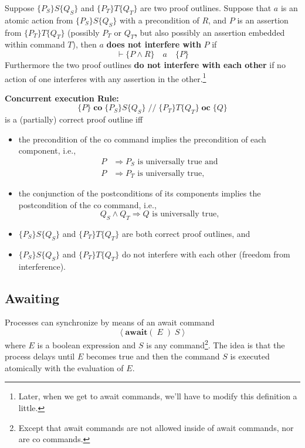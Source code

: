 \documentclass[muchmore,11pt]{article}%
\begin{document}
Suppose $\{P_{S}\}S\{Q_{S}\}$ and $\{P_{T}\}T\{Q_{T}\}$ are two proof
outlines. Suppose that $a$ is an atomic action from $\{P_{S}\}S\{Q_{S}\}$ with
a precondition of $R$, and $P$ is an assertion from $\{P_{T}\}T\{Q_{T}\}$
(possibly $P_{T}$ or $Q_{T}$\textbf{,} but also possibly an assertion embedded
within command $T$), then $a$ \textbf{does not interfere with} $P$ if%
\[
\vdash\{P\wedge R\}\quad a\quad\{P\}
\]
Furthermore the two proof outlines \textbf{do not interfere with each other}
if no action of one interferes with any assertion in the
other.\footnote{Later, when we get to await commands, we'll have to modify
this definition a little.}

\textbf{Concurrent execution Rule:}
\[
\{P\}\;\mathbf{co}\;\{P_{S}\}S\{Q_{S}\}\;//\;\{P_{T}\}T\{Q_{T}\}\;\mathbf{oc}%
\;\{Q\}
\]
is a (partially) correct proof outline iff

\begin{itemize}
\item the precondition of the co command implies the precondition of each
component, i.e.,%
\begin{align*}
P  &  \Rightarrow P_{S}\text{ is universally true and}\\
P  &  \Rightarrow P_{T}\text{ is universally true,}%
\end{align*}


\item the conjunction of the postconditions of its components implies the
postcondition of the co command, i.e.,%
\[
Q_{S}\wedge Q_{T}\Rightarrow Q\text{ is universally true,}%
\]


\item $\{P_{S}\}S\{Q_{S}\}$ and $\{P_{T}\}T\{Q_{T}\}$ are both correct proof
outlines, and

\item $\{P_{S}\}S\{Q_{S}\}$ and $\{P_{T}\}T\{Q_{T}\}$ do not interfere with
each other (freedom from interference).
%

\end{itemize}

\subsection{Awaiting}

Processes can synchronize by means of an await command%
\[
\left\langle \mathbf{await}(\;E\;)\;S\right\rangle
\]
where $E$ is a boolean expression and $S$ is any command\footnote{Except that
await commands are not allowed inside of await commands, nor are co
commands.}. The idea is that the process delays until $E$ becomes true and
then the command $S$ is executed atomically with the evaluation of $E$.
\end{document}
